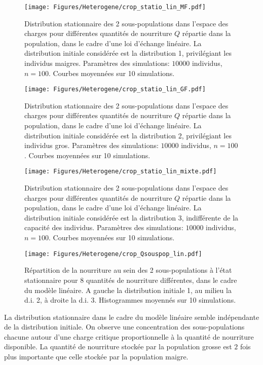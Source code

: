 \begin{figure}[h!]
\centering
\texttt{[image: Figures/Heterogene/crop\_statio\_lin\_MF.pdf]}
\caption{Distribution stationnaire des 2 sous-populations dans l'espace des charges pour différentes quantités de nourriture $Q$ répartie dans la population, dans le cadre d'une loi d'échange linéaire. La distribution initiale considérée est la distribution 1, privilégiant les individus maigres. Paramètres des simulations: $10000$ individus, $n=100$. Courbes moyennées sur 10 simulations.}
\label{statio_lin_MF}
\end{figure}

\begin{figure}[h!]
\centering
\texttt{[image: Figures/Heterogene/crop\_statio\_lin\_GF.pdf]}
\caption{Distribution stationnaire des 2 sous-populations dans l'espace des charges pour différentes quantités de nourriture $Q$ répartie dans la population, dans le cadre d'une loi d'échange linéaire. La distribution initiale considérée est la distribution 2, privilégiant les individus gros. Paramètres des simulations: $10000$ individus, $n=100$. Courbes moyennées sur 10 simulations.}
\label{statio_lin_GF}
\end{figure}

\begin{figure}[h!]
\centering
\texttt{[image: Figures/Heterogene/crop\_statio\_lin\_mixte.pdf]}
\caption{Distribution stationnaire des 2 sous-populations dans l'espace des charges pour différentes quantités de nourriture $Q$ répartie dans la population, dans le cadre d'une loi d'échange linéaire. La distribution initiale considérée est la distribution 3, indifférente de la capacité des individus. Paramètres des simulations: $10000$ individus, $n=100$. Courbes moyennées sur 10 simulations.}
\label{statio_lin_mixte}
\end{figure}


\begin{figure}[h!]
\centering
\texttt{[image: Figures/Heterogene/crop\_Qsouspop\_lin.pdf]}
\caption{Répartition de la nourriture au sein des 2 sous-populations à l'état stationnaire pour 8 quantités de nourriture différentes, dans le cadre du modèle linéaire. A gauche la distribution initiale 1, au milieu la d.i. 2, à droite la d.i. 3. Histogrammes moyennés sur 10 simulations.}
\label{Qsouspop_lin}
\end{figure}

La distribution stationnaire dans le cadre du modèle linéaire semble indépendante de la distribution initiale. On observe une concentration des sous-populations chacune autour d'une charge critique proportionnelle à la quantité de nourriture disponible. La quantité de nourriture stockée par la population grosse est $2$ fois plus importante que celle stockée par la population maigre.



